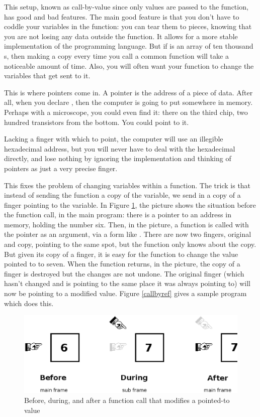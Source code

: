 \documentclass[12pt]{article}
\begin{document}
This setup, known as call-by-value since only values are passed to the
function, has good and bad features. The main good feature is that you
don't have to coddle your variables in the function: you can tear them to
pieces, knowing that you are not losing any data outside the function. It
allows for a more stable implementation of the programming language. But if 
is an array of ten thousand s, then making a copy every time
you call a common function will take a noticeable amount of time. Also,
you will often want your function to change the variables that get
sent to it.

This is where pointers come in. A pointer is the address of a piece of
data. After all, when you declare , then the computer is
going to put  somewhere in memory. Perhaps with a microscope,
you could even find it: there on the third chip, two hundred transistors
from the bottom. You could point to it.

Lacking a finger with which to point, the computer will use
an illegible hexadecimal address, but you will never have to deal with
the hexadecimal directly, and lose nothing by ignoring the implementation
and thinking of pointers as just a very precise finger.

This fixes the problem of changing variables within a function. The
trick is that instead of sending the function a copy of the variable,
we send in a copy of a finger pointing to the variable. 
In Figure \ref{fingerfig}, the  picture shows the situation
before the function call, in the main program: there is a pointer to an
address in memory, holding the number six. Then, in the  picture,
a function is called with the pointer as an argument, via a form like
.
There are now
two fingers, original and copy, pointing to the same spot, but the
function only knows about the copy.  But given its copy of a finger, it
is easy for the function to change the value pointed to to seven. When
the function returns, in the  picture, the copy of a finger is
destroyed but the changes are not undone.  The original finger (which
hasn't changed and is pointing to the same place it was always pointing
to) will now be pointing to a modified value.  Figure \ref{callbyref}
gives a sample program which does this.


\begin{figure}
\hskip -1cm
\includegraphics[width=\textwidth*\real{1.1}]{finger.ps}
\caption{Before, during, and after a function call that modifies a pointed-to value}
\label{fingerfig}
\end{figure}
\end{document}
